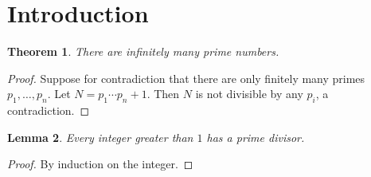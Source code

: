 \documentclass{article}
\newtheorem{theorem}{Theorem}[section]
\newtheorem{lemma}[theorem]{Lemma}
\begin{document}
\section{Introduction}
\label{sec:intro}

\begin{theorem}
\label{thm:primes}
There are infinitely many prime numbers.
\end{theorem}

\begin{proof}
Suppose for contradiction that there are only finitely many primes
$p_1, \ldots, p_n$. Let $N = p_1 \cdots p_n + 1$. Then $N$ is not
divisible by any $p_i$, a contradiction.
\end{proof}

\begin{lemma}
\label{lem:euclid}
Every integer greater than $1$ has a prime divisor.
\end{lemma}

\begin{proof}
By induction on the integer.
\end{proof}
\end{document}
